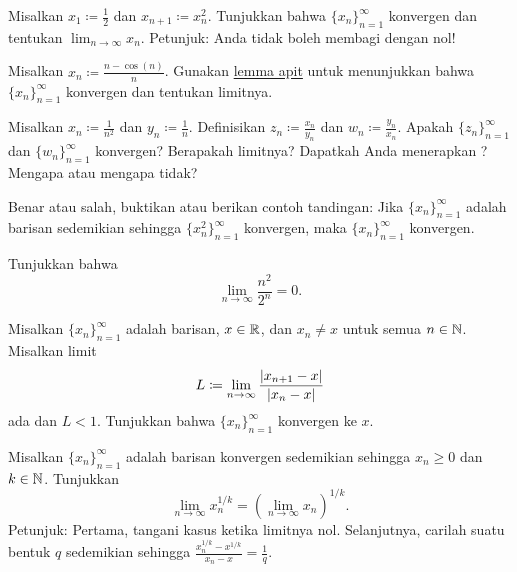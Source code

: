 \begin{exercise}
Misalkan $x_1 \coloneqq \frac{1}{2}$ dan $x_{n+1} \coloneqq x_n^2$.  Tunjukkan bahwa
$\{ x_n \}_{n=1}^\infty$ konvergen dan tentukan
$\lim_{n\to\infty} x_n$.  Petunjuk: Anda tidak boleh membagi dengan nol!
\end{exercise}

\begin{exercise}
Misalkan $x_n \coloneqq \frac{n-\cos(n)}{n}$.  Gunakan
\hyperref[squeeze:lemma]{lemma apit} untuk menunjukkan bahwa
$\{ x_n \}_{n=1}^\infty$ konvergen dan tentukan limitnya.
\end{exercise}

\begin{exercise}
Misalkan $x_n \coloneqq \frac{1}{n^2}$ dan $y_n \coloneqq \frac{1}{n}$.  Definisikan
$z_n \coloneqq \frac{x_n}{y_n}$ dan 
$w_n \coloneqq \frac{y_n}{x_n}$.  Apakah $\{ z_n \}_{n=1}^\infty$ dan $\{ w_n \}_{n=1}^\infty$
konvergen?  Berapakah limitnya?  Dapatkah Anda menerapkan ?
Mengapa atau mengapa tidak?
\end{exercise}

\begin{exercise}
Benar atau salah, buktikan atau berikan contoh tandingan:
Jika $\{ x_n \}_{n=1}^\infty$ adalah barisan
sedemikian sehingga $\{ x_n^2 \}_{n=1}^\infty$ konvergen, maka $\{ x_n \}_{n=1}^\infty$ konvergen.
\end{exercise}

\begin{exercise}
Tunjukkan bahwa
\begin{equation*}
\lim_{n\to\infty} \frac{n^2}{2^n} = 0 .
\end{equation*}
\end{exercise}

\begin{exercise}
Misalkan $\{ x_n \}_{n=1}^\infty$ adalah barisan, $x \in {\mathbb{R}}$, dan $x_n \neq x$ untuk
semua $n \in {\mathbb{N}}$.  Misalkan limit
\begin{equation*}
L \coloneqq \lim_{n \to \infty} \frac{\lvert {x_{n+1}-x} \rvert}{\lvert {x_n-x} \rvert}
\end{equation*}
ada dan $L < 1$.  Tunjukkan bahwa $\{ x_n \}_{n=1}^\infty$ konvergen ke $x$.
\end{exercise}

\begin{exercise}[Menantang]
Misalkan $\{ x_n \}_{n=1}^\infty$ adalah barisan konvergen sedemikian
sehingga $x_n \geq 0$ dan $k \in {\mathbb{N}}$.
Tunjukkan
\begin{equation*}
\lim_{n\to\infty} x_n^{1/k} =
{\left( \lim_{n\to\infty} x_n \right)}^{1/k} .
\end{equation*}
Petunjuk: Pertama, tangani kasus ketika limitnya nol.
Selanjutnya, carilah suatu bentuk $q$ sedemikian sehingga $\frac{x_n^{1/k}-x^{1/k}}{x_n-x} =
\frac{1}{q}$.
\end{exercise}

